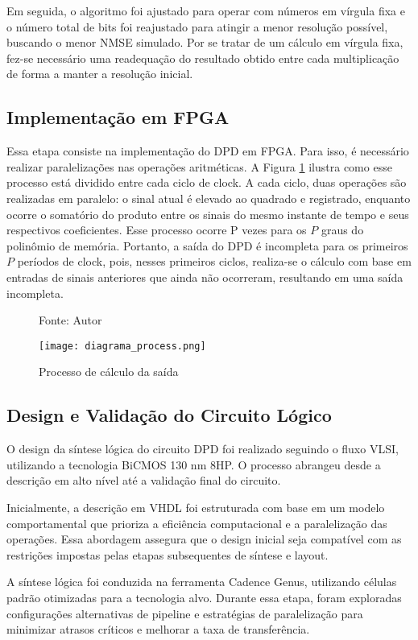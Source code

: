 Em seguida, o algoritmo foi ajustado para operar com números em vírgula fixa e o número total de bits foi reajustado para atingir a menor resolução possível, buscando o menor NMSE simulado. Por se tratar de um cálculo em vírgula fixa, fez-se necessário uma readequação do resultado obtido entre cada multiplicação de forma a manter a resolução inicial.

\subsection{Implementação em FPGA}
Essa etapa consiste na implementação do DPD em FPGA. Para isso, é necessário realizar paralelizações nas operações aritméticas. A Figura \ref{fig:diagramaprocess} ilustra como esse processo está dividido entre cada ciclo de clock. A cada ciclo, duas operações são realizadas em paralelo: o sinal atual é elevado ao quadrado e registrado, enquanto ocorre o somatório do produto entre os sinais do mesmo instante de tempo e seus respectivos coeficientes. Esse processo ocorre P vezes para os \( P \) graus do polinômio de memória. Portanto, a saída do DPD é incompleta para os primeiros \( P \) períodos de clock, pois, nesses primeiros ciclos, realiza-se o cálculo com base em entradas de sinais anteriores que ainda não ocorreram, resultando em uma saída incompleta.

\begin{figure}[ht!]
  \centering
  \captionsetup{justification=centering}
  \caption*{Fonte: Autor}
  \texttt{[image: diagrama\_process.png]}
  \caption{Processo de cálculo da saída}
  \label{fig:diagramaprocess}
\end{figure}
  
\subsection{Design e Validação do Circuito Lógico}  
O design da síntese lógica do circuito DPD foi realizado seguindo o fluxo VLSI, utilizando a tecnologia BiCMOS 130 nm 8HP. O processo abrangeu desde a descrição em alto nível até a validação final do circuito.  

Inicialmente, a descrição em VHDL foi estruturada com base em um modelo comportamental que prioriza a eficiência computacional e a paralelização das operações. Essa abordagem assegura que o design inicial seja compatível com as restrições impostas pelas etapas subsequentes de síntese e layout.  

A síntese lógica foi conduzida na ferramenta Cadence Genus, utilizando células padrão otimizadas para a tecnologia alvo. Durante essa etapa, foram exploradas configurações alternativas de pipeline e estratégias de paralelização para minimizar atrasos críticos e melhorar a taxa de transferência.  

